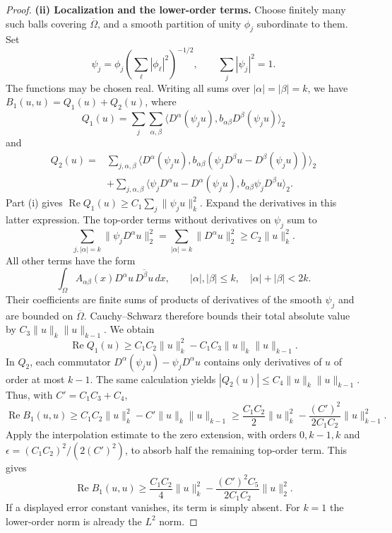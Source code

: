 \documentclass[UTF8,11pt]{ctexart}
\theoremstyle{definition}
\begin{document}
\begin{proof}
\textbf{(ii) Localization and the lower-order terms.}
Choose finitely many such balls covering $\overline\Omega$, and a smooth
partition of unity $\phi_j$ subordinate to them. Set
\[
\psi_j=\phi_j\left(\sum_\ell|\phi_\ell|^2\right)^{-1/2},
\qquad \sum_j|\psi_j|^2=1.
\]
The functions may be chosen real. Writing all sums over
$|\alpha|=|\beta|=k$, we have $B_1(u,u)=Q_1(u)+Q_2(u)$, where
\[
Q_1(u)=\sum_j\sum_{\alpha,\beta}
 \langle D^\alpha(\psi_j u),b_{\alpha\beta}D^\beta(\psi_j u)\rangle_2
\]
and
\begin{align*}
Q_2(u)={}&\sum_{j,\alpha,\beta}
\langle D^\alpha(\psi_j u),
 b_{\alpha\beta}(\psi_jD^\beta u-D^\beta(\psi_j u))\rangle_2\\
&+\sum_{j,\alpha,\beta}
\langle\psi_jD^\alpha u-D^\alpha(\psi_j u),
 b_{\alpha\beta}\psi_jD^\beta u\rangle_2.
\end{align*}
Part (i) gives $\operatorname{Re}Q_1(u)\geq C_1\sum_j\|\psi_ju\|_k^2$.
Expand the derivatives in this latter expression. The top-order terms
without derivatives on $\psi_j$ sum to
\[
\sum_{j,|\alpha|=k}\|\psi_jD^\alpha u\|_2^2
=\sum_{|\alpha|=k}\|D^\alpha u\|_2^2\geq C_2\|u\|_k^2.
\]
All other terms have the form
\[
\int_\Omega A_{\alpha\beta}(x)D^\alpha u\,
\overline{D^\beta u}\,dx,
\qquad |\alpha|,|\beta|\leq k,\quad |\alpha|+|\beta|<2k.
\]
Their coefficients are finite sums of products of derivatives of the
smooth $\psi_j$ and are bounded on $\overline\Omega$.
Cauchy--Schwarz therefore bounds their total absolute value by
$C_3\|u\|_k\|u\|_{k-1}$. We obtain
\[
\operatorname{Re}Q_1(u)\geq C_1C_2\|u\|_k^2-C_1C_3\|u\|_k\|u\|_{k-1}.
\]
In $Q_2$, each commutator
$D^\alpha(\psi_ju)-\psi_jD^\alpha u$ contains only derivatives of $u$
of order at most $k-1$. The same calculation yields
$|Q_2(u)|\leq C_4\|u\|_k\|u\|_{k-1}$.
Thus, with $C'=C_1C_3+C_4$,
\[
\operatorname{Re}B_1(u,u)\geq C_1C_2\|u\|_k^2-C'\|u\|_k\|u\|_{k-1}
\geq\frac{C_1C_2}{2}\|u\|_k^2-
 \frac{(C')^2}{2C_1C_2}\|u\|_{k-1}^2.
\]
Apply the interpolation estimate to the zero extension, with orders
$0,k-1,k$ and $\epsilon=(C_1C_2)^2/(2(C')^2)$, to absorb half the
remaining top-order term. This gives
\[
\operatorname{Re}B_1(u,u)\geq\frac{C_1C_2}{4}\|u\|_k^2-
 \frac{(C')^2C_5}{2C_1C_2}\|u\|_2^2.
\]
If a displayed error constant vanishes, its term is simply absent.
For $k=1$ the lower-order norm is already the $L^2$ norm.
\end{proof}
\end{document}
